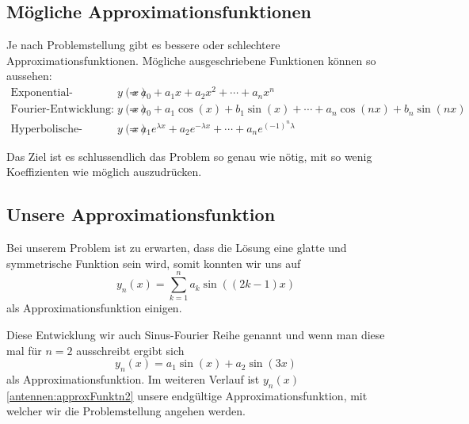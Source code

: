 \subsection{Mögliche Approximationsfunktionen\label{antennen:approxBsp}}

Je nach Problemstellung gibt es bessere oder schlechtere Approximationsfunktionen.
Mögliche ausgeschriebene Funktionen können so aussehen:
\begin{equation}
	\begin{aligned}
		\text{Exponential-Entwicklung: }
		y(x)
		&=
		a_0+a_1 x+a_2 x^2+\cdots+a_n x^n \\
		\text{Fourier-Entwicklung: } 
		y(x)
		&=
		a_0+a_1\cos(x)+b_1\sin(x)+\cdots+a_n\cos(n x)+b_n\sin(n x)\\
		\text{Hyperbolische-Entwicklung: } 
		y(x)
		&=
		a_1 e^{\lambda x}+a_2 e^{-\lambda x}+\cdots+a_n e^{(-1)^n \lambda}
	\end{aligned}
\label{antennen:approxFunktBsp}
\end{equation}

Das Ziel ist es schlussendlich das Problem so genau wie nötig, mit so wenig
Koeffizienten wie möglich auszudrücken.


\subsection{Unsere Approximationsfunktion\label{antennen:unsereApproxFunkt}}

Bei unserem Problem ist zu erwarten, dass die Lösung eine glatte und symmetrische
Funktion sein wird, somit konnten wir uns auf
\begin{equation}
y_n(x)
= 
\sum_{k=1}^n a_k\sin((2k-1)x)
\label{antennen:unserRitz}
\end{equation}
als Approximationsfunktion einigen. 

Diese Entwicklung wir auch Sinus-Fourier Reihe genannt
und wenn man diese mal für $n=2$ ausschreibt ergibt sich
\begin{equation}
y_n(x)
=
a_1\sin(x)+a_2\sin(3x)
\label{antennen:approxFunktn2}
\end{equation}
als Approximationsfunktion. Im weiteren Verlauf ist $y_n(x)$ \eqref{antennen:approxFunktn2} 
unsere endgültige Approximationsfunktion, mit welcher wir die Problemstellung angehen werden.




